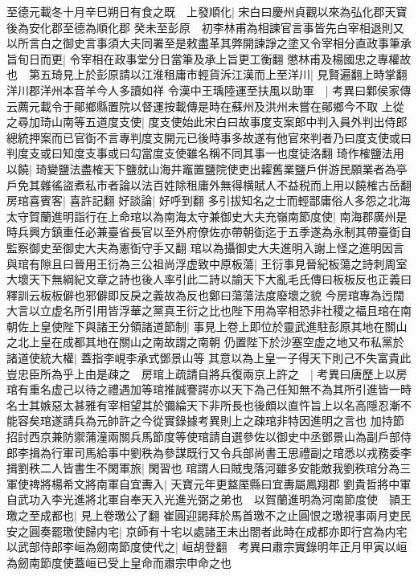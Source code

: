 至德元載冬十月辛巳朔日有食之既　上發順化|{
	宋白曰慶州貞觀以來為弘化郡天寶後為安化郡至德為順化郡}
癸未至彭原　初李林甫為相諫官言事皆先白宰相退則又以所言白之御史言事須大夫同署至是敕盡革其弊開諫諍之塗又令宰相分直政事筆承旨旬日而更|{
	令宰相在政事堂分日當筆及承上旨更工衡翻}
懲林甫及楊國忠之專權故也　第五琦見上於彭原請以江淮租庸市輕貨泝江漢而上至洋川|{
	見賢遍翻上時掌翻洋川郡洋州本音羊今人多讀如祥}
令漢中王瑀陸運至扶風以助軍　|{
	考異曰鄴侯家傳云薦元載令于鄖鄉縣置院以督運按載傳是時在蘇州及洪州未嘗在鄖鄉今不取}
上從之尋加琦山南等五道度支使|{
	度支使始此宋白曰故事度支案郎中判入員外判出侍郎總統押案而已官衘不言專判度支開元已後時事多故遂有他官來判者乃曰度支使或曰判度支或曰知度支事或曰勾當度支使雖名稱不同其事一也度徒洛翻}
琦作榷鹽法用以饒|{
	琦變鹽法盡榷天下鹽就山海井竈置鹽院使吏出糶舊業鹽戶併游民願業者為亭戶免其雜徭盜煮私市者論以法百姓除租庸外無得横賦人不益税而上用以饒榷古岳翻}
房琯喜賓客|{
	喜許記翻}
好談論|{
	好呼到翻}
多引拔知名之士而輕鄙庸俗人多怨之北海太守賀蘭進明詣行在上命琯以為南海太守兼御史大夫充嶺南節度使|{
	南海郡廣州是時兵興方鎮重任必兼臺省長官以至外府僚佐亦帶朝衘迄于五季遂為永制其帶臺衘自監察御史至御史大夫為憲衘守手又翻}
琯以為攝御史大夫進明入謝上怪之進明因言與琯有隙且曰晉用王衍為三公祖尚浮虚致中原板蕩|{
	王衍事見晉紀板蕩之詩刺周室大壞天下無綱紀文章之詩也後人率引此二詩以諭天下大亂毛氏傳曰板板反也正義曰釋訓云板板僻也邪僻即反戾之義故為反也鄭曰蕩蕩法度廢壞之貌}
今房琯專為迃闊大言以立虚名所引用皆浮華之黨真王衍之比也陛下用為宰相恐非社稷之福且琯在南朝佐上皇使陛下與諸王分領諸道節制|{
	事見上卷上即位於靈武進駐彭原其地在關山之北上皇在成都其地在關山之南故謂之南朝}
仍置陛下於沙塞空虚之地又布私黨於諸道使統大權|{
	蓋指李峴李承式鄧景山等}
其意以為上皇一子得天下則己不失富貴此豈忠臣所為乎上由是疎之　房琯上疏請自將兵復兩京上許之　|{
	考異曰唐歷上以房琯有重名虚己以待之禮遇加等琯推誠謇諤亦以天下為己任知無不為其所引進皆一時名士其嫉惡太甚雅有宰相望其於彌綸天下非所長也後頗以直忤旨上以名高隱忍漸不能容矣琯遂請兵為元帥許之今從實錄據考異則上之疎琯非特因進明之言也}
加持節招討西京兼防禦蒲潼兩關兵馬節度等使琯請自選參佐以御史中丞鄧景山為副戶部侍郎李揖為行軍司馬給事中劉秩為參謀既行又令兵部尚書王思禮副之琯悉以戎務委李揖劉秩二人皆書生不閑軍旅|{
	閑習也}
琯謂人曰賊曳落河雖多安能敵我劉秩琯分為三軍使禆將楊希文將南軍自宜夀入|{
	天寶元年更盩厔縣曰宜夀屬鳳翔郡}
劉貴哲將中軍自武功入李光進將北軍自奉天入光進光弼之弟也　以賀蘭進明為河南節度使　頴王璬之至成都也|{
	見上卷璬公了翻}
崔圓迎謁拜於馬首璬不之止圓恨之璬視事兩月吏民安之圓奏罷璬使歸内宅|{
	京師有十宅以處諸王未出閤者此時在成都亦即行宫為内宅}
以武部侍郎李峘為劒南節度使代之|{
	峘胡登翻　考異曰肅宗實錄明年正月甲寅以峘為劒南節度使蓋峘已受上皇命而肅宗申命之也}
